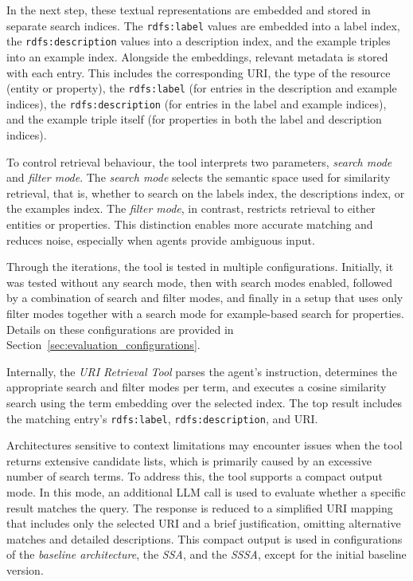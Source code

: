 \documentclass[a4paper,oneside,bibliography=totoc]{scrbook}
\begin{document}
In the next step, these textual representations are embedded and stored in separate search indices. The \texttt{rdfs:label} values are embedded into a label index, the \texttt{rdfs:description} values into a description index, and the example triples into an example index. Alongside the embeddings, relevant metadata is stored with each entry. This includes the corresponding \ac{URI}, the type of the resource (entity or property), the \texttt{rdfs:label} (for entries in the description and example indices), the \texttt{rdfs:description} (for entries in the label and example indices), and the example triple itself (for properties in both the label and description indices).

To control retrieval behaviour, the tool interprets two parameters, \textit{search mode} and \textit{filter mode}. The \textit{search mode} selects the semantic space used for similarity retrieval, that is, whether to search on the labels index, the descriptions index, or the examples index. The \textit{filter mode}, in contrast, restricts retrieval to either entities or properties. This distinction enables more accurate matching and reduces noise, especially when agents provide ambiguous input.

Through the iterations, the tool is tested in multiple configurations. Initially, it was tested without any search mode, then with search modes enabled, followed by a combination of search and filter modes, and finally in a setup that uses only filter modes together with a search mode for example-based search for properties. Details on these configurations are provided in Section~\ref{sec:evaluation_configurations}.

Internally, the \textit{\ac{URI} Retrieval Tool} parses the agent's instruction, determines the appropriate search and filter modes per term, and executes a cosine similarity search using the term embedding over the selected index. The top result includes the matching entry's \texttt{rdfs:label}, \texttt{rdfs:description}, and \ac{URI}.

Architectures sensitive to context limitations may encounter issues when the tool returns extensive candidate lists, which is primarily caused by an excessive number of search terms. To address this, the tool supports a compact output mode. In this mode, an additional \ac{LLM} call is used to evaluate whether a specific result matches the query. The response is reduced to a simplified \ac{URI} mapping that includes only the selected \ac{URI} and a brief justification, omitting alternative matches and detailed descriptions. This compact output is used in configurations of the \textit{baseline architecture}, the \textit{\ac{SSA}}, and the \textit{\ac{SSSA}}, except for the initial baseline version.
\end{document}
